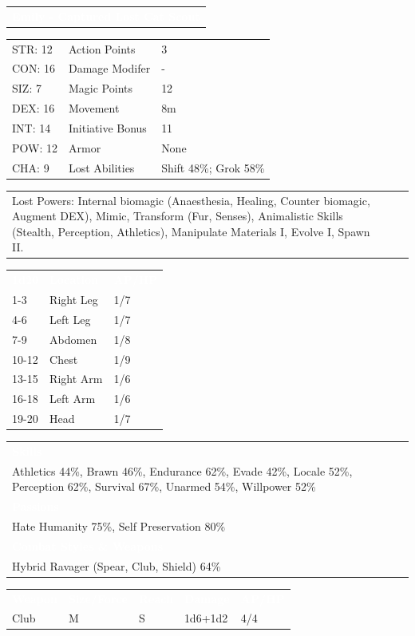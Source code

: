 \documentclass[letterpaper,serif]{rpg-module}
\begin{document}

\vspace{12pt}

\noindent\begin{tabularx}{\linewidth}{X}
\rowcolor{gray}
\textcolor{white}{\textbf{Emily - Captured Lost Cat Scout}}
\end{tabularx}
\begin{tabularx}{\linewidth}{XXX}
STR: 12 & Action Points & 3 \\
CON: 16 & Damage Modifer & - \\
SIZ: 7 & Magic Points & 12 \\
DEX: 16 & Movement & 8m \\
INT: 14 & Initiative Bonus & 11 \\
POW: 12 & Armor & None \\
CHA: 9 & Lost Abilities & Shift 48\%; Grok 58\% \\
\end{tabularx}
\begin{tabularx}{\linewidth}{XXX}
Lost Powers: Internal biomagic (Anaesthesia, Healing, Counter biomagic, Augment DEX), Mimic, Transform (Fur, Senses), Animalistic Skills (Stealth, Perception, Athletics), Manipulate Materials I, Evolve I, Spawn II. 
\end{tabularx}

\begin{tabularx}{\linewidth}{XXX}
\rowcolor{gray}
\textcolor{white}{\textbf{1d20}} & \textcolor{white}{\textbf{Location}} & \textcolor{white}{\textbf{AP/HP}} \\
1-3 & Right Leg & 1/7 \\
4-6 & Left Leg & 1/7 \\
7-9 & Abdomen & 1/8 \\
10-12 & Chest & 1/9 \\
13-15 & Right Arm & 1/6 \\
16-18 & Left Arm & 1/6 \\
19-20 & Head & 1/7 
\end{tabularx}
\begin{tabularx}{\linewidth}{X}
\rowcolor{gray}
\textcolor{white}{\textbf{Skills}} \\
Athletics 44\%, Brawn 46\%, Endurance 62\%, Evade 42\%, Locale 52\%, Perception 62\%, Survival 67\%, Unarmed 54\%, Willpower 52\%\\
\rowcolor{gray}
\textcolor{white}{\textbf{Passions}} \\
Hate Humanity 75\%, Self Preservation 80\% \\
\rowcolor{gray}
\textcolor{white}{\textbf{Combat Styles \& Weapons}} \\
Hybrid Ravager (Spear, Club, Shield) 64\%
\end{tabularx}
\begin{tabularx}{\linewidth}{XXXXX}
\rowcolor{gray}
\textcolor{white}{\textbf{Weapon}} & \textcolor{white}{\textbf{Size/Force}} & \textcolor{white}{\textbf{Reach}} & \textcolor{white}{\textbf{Damage}} & \textcolor{white}{\textbf{AP/HP}} \\
Club & M & S & 1d6+1d2 & 4/4
\end{tabularx}
\end{document}
